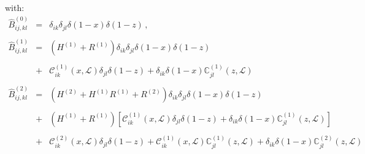 \documentclass[10pt,a4paper]{article}
\begin{document}
with:
\begin{equation}\label{eq:pertcoefb}
\begin{array}{rcl}
  \displaystyle \hat{B}_{ij,kl}^{(0)} &=&\displaystyle
                                          \delta_{ik}\delta_{jl}\delta(1-x)\delta(1-z)\,,\\
  \\
  \displaystyle \hat{B}_{ij,kl}^{(1)} &=&\displaystyle
                                          (H^{(1)}+R^{(1)})\delta_{ik}\delta_{jl}\delta(1-x)\delta(1-z)\\
  \\
                                      &+& \mathcal{C}_{ik}^{(1)}(x,\mathcal{L})\delta_{jl}\delta(1-z) + \delta_{ik}\delta(1-x)\mathbb{C}_{jl}^{(1)}(z,\mathcal{L})\\
  \\
  \displaystyle \hat{B}_{ij,kl}^{(2)} &=& \displaystyle
                                          (H^{(2)}+H^{(1)}R^{(1)}+R^{(2)})
                                          \delta_{ik}\delta_{jl}\delta(1-x)\delta(1-z)\\
  \\
                                      &+&\displaystyle
                                          (H^{(1)}+R^{(1)})\left[\mathcal{C}_{ik}^{(1)}(x,\mathcal{L})\delta_{jl}\delta(1-z)
                                          +
                                          \delta_{ik}\delta(1-x)\mathbb{C}_{jl}^{(1)}(z,\mathcal{L})\right]\\
  \\
                                      &+& \mathcal{C}_{ik}^{(2)}(x,\mathcal{L})\delta_{jl}\delta(1-z) + 
                                          \mathcal{C}_{ik}^{(1)}(x,\mathcal{L})\mathbb{C}_{jl}^{(1)}(z,\mathcal{L})
                                          +\delta_{ik}\delta(1-x)\mathbb{C}_{jl}^{(2)}(z,\mathcal{L})
\end{array}
\end{equation}
\end{document}
